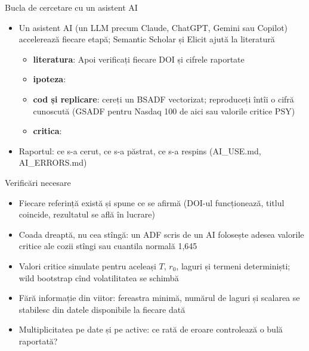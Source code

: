 \begin{frame}{Bucla de cercetare cu un asistent AI}
\itemsize{\footnotesize}
\begin{itemize}
    \item Un asistent AI (un LLM precum Claude, ChatGPT, Gemini sau Copilot) accelerează fiecare etapă; Semantic Scholar și Elicit ajută la literatură
    \begin{itemize}
        \item \textbf{literatura}:  Apoi verificați fiecare DOI și cifrele raportate
        \item \textbf{ipoteza}: 
        \item \textbf{cod și replicare}: cereți un BSADF vectorizat; reproduceți întîi o cifră cunoscută (GSADF pentru Nasdaq 100 de aici sau valorile critice PSY)
        \item \textbf{critica}: 
    \end{itemize}
    \item Raportul: ce s-a cerut, ce s-a păstrat, ce s-a respins (AI\_USE.md, AI\_ERRORS.md)
\end{itemize}
\end{frame}

\begin{frame}{Verificări necesare}
\itemsize{\small}
\begin{itemize}
    \item Fiecare referință există și spune ce se afirmă (DOI-ul funcționează, titlul coincide, rezultatul se află în lucrare)
    \item Coada dreaptă, nu cea stîngă: un ADF scris de un AI folosește adesea valorile critice ale cozii stîngi sau cuantila normală 1,645
    \item Valori critice simulate pentru aceleași $T$, $r_0$, laguri și termeni determiniști; wild bootstrap cînd volatilitatea se schimbă
    \item Fără informație din viitor: fereastra minimă, numărul de laguri și scalarea se stabilesc din datele disponibile la fiecare dată
    \item Multiplicitatea pe date și pe active: ce rată de eroare controlează o bulă raportată?
\end{itemize}
\end{frame}

